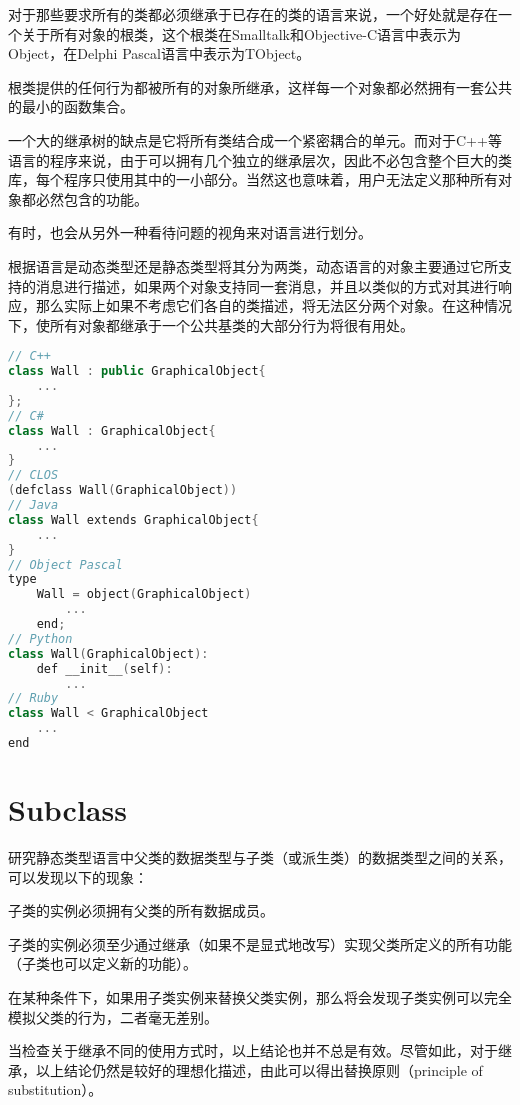 对于那些要求所有的类都必须继承于已存在的类的语言来说，一个好处就是存在一个关于所有对象的根类，这个根类在Smalltalk和Objective-C语言中表示为Object，在Delphi Pascal语言中表示为TObject。

根类提供的任何行为都被所有的对象所继承，这样每一个对象都必然拥有一套公共的最小的函数集合。

一个大的继承树的缺点是它将所有类结合成一个紧密耦合的单元。而对于C++等语言的程序来说，由于可以拥有几个独立的继承层次，因此不必包含整个巨大的类库，每个程序只使用其中的一小部分。当然这也意味着，用户无法定义那种所有对象都必然包含的功能。

有时，也会从另外一种看待问题的视角来对语言进行划分。

根据语言是动态类型还是静态类型将其分为两类，动态语言的对象主要通过它所支持的消息进行描述，如果两个对象支持同一套消息，并且以类似的方式对其进行响应，那么实际上如果不考虑它们各自的类描述，将无法区分两个对象。在这种情况下，使所有对象都继承于一个公共基类的大部分行为将很有用处。

\begin{lstlisting}[language=C++]
// C++
class Wall : public GraphicalObject{
	...
};
// C#
class Wall : GraphicalObject{
	...
}
// CLOS
(defclass Wall(GraphicalObject))
// Java
class Wall extends GraphicalObject{
	...
}
// Object Pascal
type
	Wall = object(GraphicalObject)
		...
	end;
// Python
class Wall(GraphicalObject):
	def __init__(self):
		...
// Ruby
class Wall < GraphicalObject
	...
end
\end{lstlisting}


\chapter{Subclass}

研究静态类型语言中父类的数据类型与子类（或派生类）的数据类型之间的关系，可以发现以下的现象：

\begin{compactitem}
\item 子类的实例必须拥有父类的所有数据成员。
\item 子类的实例必须至少通过继承（如果不是显式地改写）实现父类所定义的所有功能（子类也可以定义新的功能）。
\item 在某种条件下，如果用子类实例来替换父类实例，那么将会发现子类实例可以完全模拟父类的行为，二者毫无差别。
\end{compactitem}

当检查关于继承不同的使用方式时，以上结论也并不总是有效。尽管如此，对于继承，以上结论仍然是较好的理想化描述，由此可以得出替换原则（principle of substitution）。

